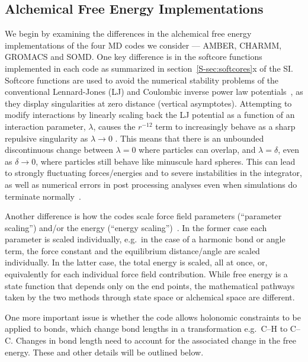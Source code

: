 \documentclass[journal=jctcce,manuscript=article]{achemso}
\begin{document}
\subsection{Alchemical Free Energy Implementations}
\label{sec:afe_impl}

We begin by examining the differences in the alchemical free energy
implementations of the four MD codes we consider --- AMBER, CHARMM, GROMACS and
SOMD.  One key difference is in the softcore
functions~\cite{beutler_avoiding_1994, zacharias_separationshifted_1994}
implemented in each code as summarized in section~\ref{S-sec:softcores}x of the
SI.  Softcore functions are used to avoid the numerical
stability problems of the conventional Lennard-Jones (LJ) and Coulombic inverse power law
potentials~\cite{ISI:A1993MB07100015,steinbrecher_nonlinear_2007}, as they display singularities at
zero distance (vertical asymptotes).  Attempting to modify interactions by
linearly scaling back the LJ potential as a function of an
interaction parameter, $\lambda$, causes the $r^{-12}$ term to increasingly behave
as a sharp repulsive singularity as $\lambda\rightarrow 0$ \cite{ISI:A1993MB07100015}.  This means that there
is an unbounded discontinuous change between $\lambda = 0$ where particles can overlap,
and $\lambda = \delta$, even as $\delta \rightarrow 0$, where particles still
behave like minuscule hard spheres.  This can lead to strongly
fluctuating forces/energies and to severe instabilities in the integrator, as
well as numerical errors in post processing analyses even when simulations do
terminate normally~\cite{beutler_avoiding_1994,
zacharias_separationshifted_1994, steinbrecher_nonlinear_2007}.

Another difference is how the codes scale force field parameters (``parameter
scaling'') and/or the energy (``energy
scaling'')~\cite{doi:10.1021/jp981628n}.  In the former case each parameter is
scaled individually, e.g.\ in the case of a harmonic bond or angle term,
the force constant and the equilibrium distance/angle are scaled
individually.  In the
latter case, the total energy is scaled, all at once, or, equivalently for each
individual force field contribution.  While free energy is a state function that
depends only on the end points, the mathematical pathways taken by the
two methods through state space or alchemical space are different.

One more important issue is whether the code allows holonomic constraints to be applied
to bonds, which change bond lengths in a transformation e.g.\ C--H to C--C.
Changes in bond length need to account for the associated change in the free
energy.  These and other details will be outlined below.
\end{document}
